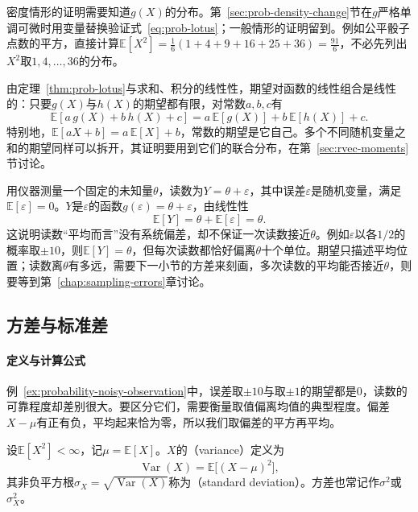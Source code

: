 密度情形的证明需要知道$g(X)$的分布。第~\ref{sec:prob-density-change}节在$g$严格单调可微时用变量替换验证式~\eqref{eq:prob-lotus}；一般情形的证明留到。例如公平骰子点数的平方，直接计算$\mathbb{E}[X^2]=\frac16(1+4+9+16+25+36)=\frac{91}{6}$，不必先列出$X^2$取$1,4,\dots,36$的分布。

由定理~\ref{thm:prob-lotus}与求和、积分的线性性，期望对函数的线性组合是线性的：只要$g(X)$与$h(X)$的期望都有限，对常数$a,b,c$有
\[
  \mathbb{E}[a\,g(X)+b\,h(X)+c]=a\,\mathbb{E}[g(X)]+b\,\mathbb{E}[h(X)]+c .
\]
特别地，$\mathbb{E}[aX+b]=a\,\mathbb{E}[X]+b$，常数的期望是它自己。多个不同随机变量之和的期望同样可以拆开，其证明要用到它们的联合分布，在第~\ref{sec:rvec-moments}节讨论。

\begin{example}[带噪观测的平均目标]
\label{ex:probability-noisy-observation}
用仪器测量一个固定的未知量$\theta$，读数为$Y=\theta+\varepsilon$，其中误差$\varepsilon$是随机变量，满足$\mathbb{E}[\varepsilon]=0$。$Y$是$\varepsilon$的函数$g(\varepsilon)=\theta+\varepsilon$，由线性性
\[
  \mathbb{E}[Y]=\theta+\mathbb{E}[\varepsilon]=\theta .
\]
这说明读数“平均而言”没有系统偏差，却不保证一次读数接近$\theta$。例如$\varepsilon$以各$1/2$的概率取$\pm10$，则$\mathbb{E}[Y]=\theta$，但每次读数都恰好偏离$\theta$十个单位。期望只描述平均位置；读数离$\theta$有多远，需要下一小节的方差来刻画，多次读数的平均能否接近$\theta$，则要等到第~\ref{chap:sampling-errors}章讨论。
\end{example}

\subsection{方差与标准差}
\label{sec:prob-variance}

\paragraph{定义与计算公式}
例~\ref{ex:probability-noisy-observation}中，误差取$\pm10$与取$\pm1$的期望都是$0$，读数的可靠程度却差别很大。要区分它们，需要衡量取值偏离均值的典型程度。偏差$X-\mu$有正有负，平均起来恰为零，所以我们取偏差的平方再平均。

\begin{definition}[方差与标准差]
\label{def:prob-variance}
设$\mathbb{E}[X^2]<\infty$，记$\mu=\mathbb{E}[X]$。$X$的（variance）定义为
\[
  \operatorname{Var}(X)=\mathbb{E}\bigl[(X-\mu)^2\bigr],
\]
其非负平方根$\sigma_X=\sqrt{\operatorname{Var}(X)}$称为（standard deviation）。方差也常记作$\sigma^2$或$\sigma_X^2$。
\end{definition}

